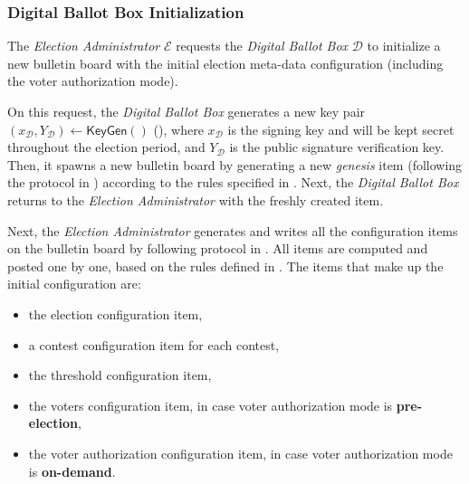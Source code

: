 \subsubsection{Digital Ballot Box Initialization} \label{sec: digital ballot box initialization}
The \textit{Election Administrator} $\mathcal{E}$ requests the \textit{Digital Ballot Box} $\mathcal{D}$ to initialize a new bulletin board with the initial election meta-data configuration (including the voter authorization mode).

On this request, the \textit{Digital Ballot Box} generates a new key pair $(x_\mathcal{D}, Y_\mathcal{D}) \gets \mathsf{KeyGen}()$ (), where $x_\mathcal{D}$ is the signing key and will be kept secret throughout the election period, and $Y_\mathcal{D}$ is the public signature verification key. Then, it spawns a new bulletin board by generating a new \textit{genesis} item (following the protocol in ) according to the rules specified in . Next, the \textit{Digital Ballot Box} returns to the \textit{Election Administrator} with the freshly created item.

Next, the \textit{Election Administrator} generates and writes all the configuration items on the bulletin board by following protocol in . All items are computed and posted one by one, based on the rules defined in . The items that make up the initial configuration are:
\begin{itemize}
    \item the election configuration item,
    \item a contest configuration item for each contest,
    \item the threshold configuration item,
    \item the voters configuration item, in case voter authorization mode is \textbf{pre-election},
    \item the voter authorization configuration item, in case voter authorization mode is \textbf{on-demand}.
\end{itemize}
